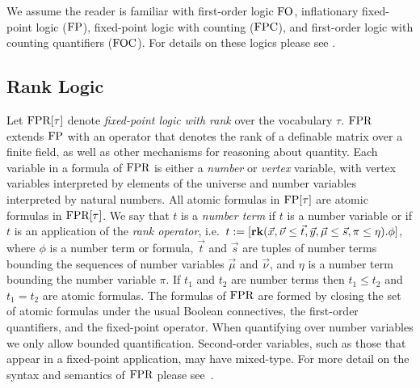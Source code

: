 \documentclass[a4paper,UKenglish]{lipics-v2018}
\begin{document}

We assume the reader is familiar with first-order logic $\text{\upshape FO}$, inflationary
fixed-point logic ($\text{\upshape FP}$), fixed-point logic with counting ($\text{\upshape FPC}$), and
first-order logic with counting quantifiers ($\text{\upshape FOC}$). For details on these
logics please see \cite{grohe2017descriptive, immerman1999descriptive}.

\subsection{Rank Logic}
Let $\text{\upshape FPR}[\tau]$ denote \emph{fixed-point logic with rank} over the vocabulary
$\tau$. $\text{\upshape FPR}$ extends $\text{\upshape FP}$ with an operator that denotes the rank of a
definable matrix over a finite field, as well as other mechanisms for reasoning
about quantity. Each variable in a formula of $\text{\upshape FPR}$ is either a \emph{number}
or \emph{vertex} variable, with vertex variables interpreted by elements of the
universe and number variables interpreted by natural numbers. All atomic
formulas in $\text{\upshape FP}[\tau]$ are atomic formulas in $\text{\upshape FPR}[\tau]$. We say that $t$ is
a \emph{number term} if $t$ is a number variable or if $t$ is an application of
the \emph{rank operator}, i.e.\ $t := [\text{\textbf{rk}} (\vec{x}, \vec {\nu} \leq \vec{t},
\vec{y},\vec{\mu} \leq \vec{s}, \pi \leq \eta). \phi]$, where $\phi$ is a number
term or formula, $\vec{t}$ and $\vec{s}$ are tuples of number terms bounding the
sequences of number variables $\vec{\mu}$ and $\vec{\nu}$, and $\eta$ is a
number term bounding the number variable $\pi$. If $t_1$ and $t_2$ are number
terms then $t_1 \leq t_2$ and $t_1 = t_2$ are atomic formulas. The formulas of
$\text{\upshape FPR}$ are formed by closing the set of atomic formulas under the usual Boolean
connectives, the first-order quantifiers, and the fixed-point operator. When
quantifying over number variables we only allow bounded quantification.
Second-order variables, such as those that appear in a fixed-point application,
may have mixed-type. For more detail on the syntax and semantics of $\text{\upshape FPR}$
please see~\cite{GradelP15a}.
\end{document}
